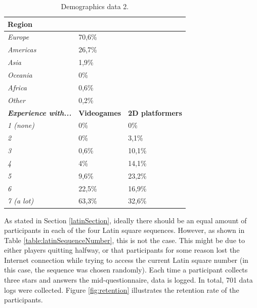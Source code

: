 \begin{table}[h]
\scriptsize
\centering
\begin{tabular}{|l|ll|}
\hline
\textbf{Region}                      &                & \textbf{}               \\ \hline
\textit{Europe}                      & 70,6\%         &                         \\ \hline
\textit{Americas}                    & 26,7\%         &                         \\ \hline
\textit{Asia}                        & 1,9\%          &                         \\ \hline
\textit{Oceania}                     & 0\%            &                         \\ \hline
\textit{Africa}                      & 0,6\%          &                         \\ \hline
\textit{Other}                       & 0,2\%          &                         \\ \hline
\textit{\textbf{Experience with...}} & \textbf{Videogames} & \textbf{2D platformers} \\ \hline
\textit{1 (none)}                           & 0\%            & 0\%                     \\ \hline
\textit{2}                           & 0\%            & 3,1\%                   \\ \hline
\textit{3}                           & 0,6\%          & 10,1\%                  \\ \hline
\textit{4}                           & 4\%            & 14,1\%                  \\ \hline
\textit{5}                           & 9,6\%          & 23,2\%                  \\ \hline
\textit{6}                           & 22,5\%         & 16,9\%                  \\ \hline
\textit{7 (a lot)}                           & 63,3\%         & 32,6\%                  \\ \hline
\end{tabular}
\caption{Demographics data 2.}
\label{table:demographics2}
\end{table}

As stated in Section \ref{latinSection}, ideally there should be an equal amount of participants in each of the four Latin square sequences. However, as shown in Table \ref{table:latinSequenceNumber}, this is not the case. This might be due to either players quitting halfway, or that participants for some reason lost the Internet connection while trying to access the current Latin square number (in this case, the sequence was chosen randomly). Each time a participant collects three stars and answers the mid-questionnaire, data is logged. In total, 701 data logs were collected. Figure \ref{fig:retention} illustrates the retention rate of the participants.

